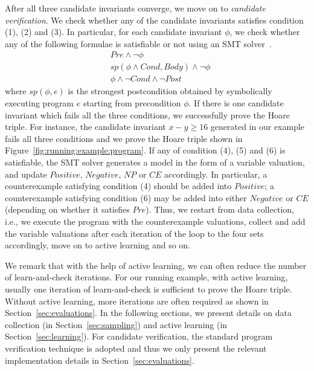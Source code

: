 After all three candidate invariants converge, we move on to \emph{candidate verification}. We check whether any of the candidate invariants satisfies condition (1), (2) and (3). In particular, for each candidate invariant $\phi$, we check whether any of the following formulae is satisfiable or not using an SMT solver~\cite{barrett2009satisfiability,de2008z3}.
\begin{align}
    & \mathit{Pre} \land \neg \phi \label{check:inv:pre} \\
     & sp(\phi \land \mathit{Cond}, \mathit{Body}) \land \neg \phi \label{check:inv:loop} \\
    & \phi \land \neg \mathit{Cond} \land \neg \mathit{Post} \label{check:inv:post}
\end{align}
where $\mathit{sp}(\phi,e)$ is the strongest postcondition obtained by
symbolically executing program $e$
starting from precondition $\phi$.
If there is one candidate invariant which fails all the three conditions, we successfully prove the Hoare triple. 
For instance, the candidate invariant $x - y \geq 16$ generated in our example fails all three conditions and we prove the Hoare triple shown in Figure~\ref{fig:running:example:program}. 
If any of condition (4), (5) and (6) is satisfiable, the SMT solver generates a model in the form of a variable valuation, 
and update $\mathit{Positive}$, $\mathit{Negative}$, $\mathit{NP}$ or $\mathit{CE}$ accordingly. %
In particular, a counterexample satisfying condition (4) should be added into $\mathit{Positive}$; 
a counterexample satisfying condition (6) may be added into either $\mathit{Negative}$ or $\mathit{CE}$ (depending on whether it satisfies $\mathit{Pre}$). 
Thus, we restart from data collection, i.e., we execute the program with the counterexample valuations, 
collect and add the variable valuations after each iteration of the loop to the four sets accordingly, move on to active learning and so on.

We remark that with the help of active learning, we can often reduce the number of learn-and-check iterations.%
For our running example, with active learning, usually one iteration of learn-and-check is sufficient to prove the Hoare triple. 
Without active learning, more iterations are often required as shown in Section~\ref{sec:evaluations}. 
In the following sections, we present details on data collection (in Section~\ref{sec:sampling}) and active learning (in Section~\ref{sec:learning}). 
For candidate verification, the standard program verification technique is adopted and thus we only present the relevant implementation details in Section~\ref{sec:evaluations}.

